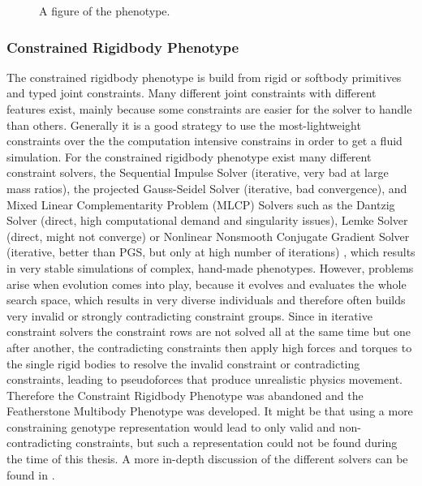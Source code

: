 \documentclass[main]{subfiles}
\begin{document}
\begin{figure}[H]
\centering


\caption[A figure of the phenotype]{A figure of the phenotype.}
\label{figure:direct-encoding}
\end{figure}

\subsubsection{Constrained Rigidbody Phenotype}

The constrained rigidbody phenotype is build from rigid or softbody primitives and typed joint constraints. Many different joint constraints with different features exist, mainly because some constraints are easier for the solver to handle than others. Generally it is a good strategy to use the most-lightweight constraints over the the computation intensive constrains in order to get a fluid simulation. For the constrained rigidbody phenotype exist many different constraint solvers, the Sequential Impulse Solver (iterative, very bad at large mass ratios), the projected Gauss-Seidel Solver (iterative, bad convergence), and Mixed Linear Complementarity Problem (MLCP) Solvers such as the Dantzig Solver (direct, high computational demand and singularity issues), Lemke Solver (direct, might not converge) or Nonlinear Nonsmooth Conjugate Gradient Solver (iterative, better than PGS, but only at high number of iterations) \cite{bib::Coumans2014}, which results in very stable simulations of complex, hand-made phenotypes. However, problems arise when evolution comes into play, because it evolves and evaluates the whole search space, which results in very diverse individuals and therefore often builds very invalid or strongly contradicting constraint groups. Since in iterative constraint solvers the constraint rows are not solved all at the same time but one after another, the contradicting constraints then apply high forces and torques to the single rigid bodies to resolve the invalid constraint or contradicting constraints, leading to pseudoforces that produce unrealistic physics movement. Therefore the Constraint Rigidbody Phenotype was abandoned and the Featherstone Multibody Phenotype was developed. It might be that using a more constraining genotype representation would lead to only valid and non-contradicting constraints, but such a representation could not be found during the time of this thesis. A more in-depth discussion of the different solvers can be found in \cite{bib::Coumans2014}.
\end{document}
